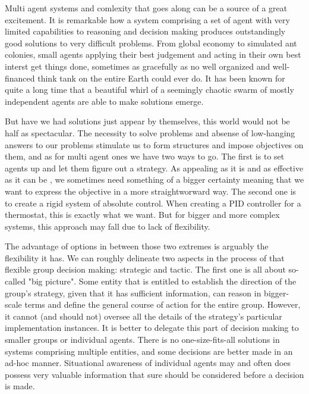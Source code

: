 Multi agent systems and comlexity that goes along can be a source of a great excitement. It is remarkable how a system
comprising a set of agent with very limited capabilities to reasoning and decision making produces outstandingly good
solutions to very difficult problems. From global economy to simulated ant colonies, small agents applying their best
judgement and acting in their own best interst get things done, sometimes as gracefully as no well organized and
well-financed think tank on the entire Earth could ever do. It has been known for quite a long time that a beautiful
whirl of a seemingly chaotic swarm of mostly independent agents are able to make solutions emerge.

But have we had solutions just appear by themselves, this world would not be half as spectacular. The necessity to solve
problems and absense of low-hanging answers to our problems stimulate us to form structures and impose objectives on
them, and as for multi agent ones we have two ways to go. The first is to set agents up and let them figure out a
strategy. As appealing as it is and as effective as it can be \cite{dorigo-2006}, we sometimes need something of a
bigger certainty meaning that we want to express the objective in a more straightworward way. The second one is to
create a rigid system of absolute control. When creating a PID controller for a thermostat, this is exactly what we
want. But for bigger and more complex systems, this approach may fall due to lack of flexibility.

The advantage of options in between those two extremes is arguably the flexibility it has. We can roughly delineate two
aspects in the process of that flexible group decision making: strategic and tactic. The first one is all about
so-called "big picture". Some entity that is entitled to establish the direction of the group's strategy, given that it
has sufficient information, can reason in bigger-scale terms and define the general course of action for the entire
group. However, it cannot (and should not) oversee all the details of the strategy's particular implementation
instances. It is better to delegate this part of decision making to smaller groups or individual agents. There is no
one-size-fits-all solutions in systems comprising multiple entities, and some decisions are better made in an ad-hoc
manner.
Situational awareness \cite{endsley-1995} of individual agents may and often does possess very valuable information that
sure should be considered before a decision is made.

